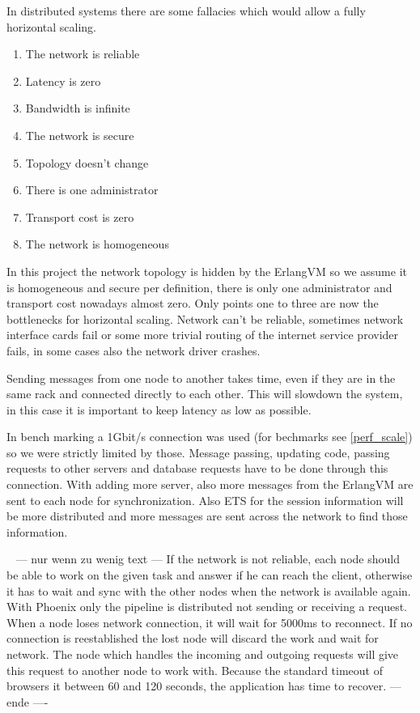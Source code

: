 In distributed systems there are some fallacies which would allow a fully horizontal scaling. 
\begin{enumerate}
\item The network is reliable
\item Latency is zero
\item Bandwidth is infinite
\item The network is secure
\item Topology doesn't change
\item There is one administrator
\item Transport cost is zero
\item The network is homogeneous
\end{enumerate}
\cite{PD001}
In this project the network topology is hidden by the ErlangVM so we assume it is homogeneous and secure per definition, there is only one administrator and transport cost nowadays almost zero. Only points one to three are now the bottlenecks for horizontal scaling.
Network can't be reliable, sometimes network interface cards fail or some more trivial routing of the internet service provider fails, in some cases also the network driver crashes.\cite{JH2007}

 Sending messages from one node to another takes time, even if they are in the same rack and connected directly to each other. This will slowdown the system, in this case it is important to keep latency as low as possible. 
 
In bench marking a 1Gbit/s connection was used (for bechmarks see \ref{perf_scale}) so we were strictly limited by those. Message passing, updating code, passing requests to other servers and database requests have to be done through this connection. With adding more server, also more messages from the ErlangVM are sent to each node for synchronization. Also ETS for the session information will be more distributed and more messages are sent across the network to find those information. 

\ \newline
--- nur wenn zu wenig text ---
If the network is not reliable, each node should be able to work on the given task and answer if he can reach the client, otherwise it has to wait and sync with the other nodes when the network is available again. With Phoenix only the pipeline is distributed not sending or receiving a request. When a node loses network connection, it will wait for 5000ms to reconnect. If no connection is reestablished the lost node will discard the work and wait for network. The node which handles the incoming and outgoing requests will give this request to another node to work with. Because the standard timeout of browsers it between 60 and 120 seconds, the application has time to recover. 
--- ende ----

